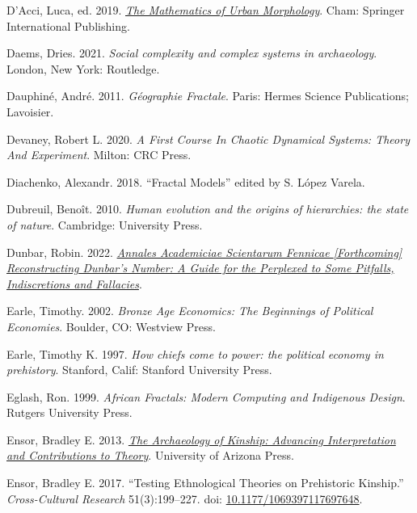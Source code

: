 \documentclass[
  12pt,
]{book}
\newlength{\cslhangindent}
\newlength{\cslentryspacingunit} %
\newenvironment{CSLReferences}[2] %
 {%
  \setlength{\parindent}{0pt}
  \ifodd #1
  \let\oldpar\par
  \def\par{\hangindent=\cslhangindent\oldpar}
  \fi
  \setlength{\parskip}{#2\cslentryspacingunit}
 }%
 {}
\begin{document}
\begin{CSLReferences}{1}{0}
\leavevmode{}%
D'Acci, Luca, ed. 2019. \emph{\href{https://doi.org/10.1007/978-3-030-12381-9}{The Mathematics of Urban Morphology}}. Cham: Springer International Publishing.

\leavevmode{}%
Daems, Dries. 2021. \emph{Social complexity and complex systems in archaeology}. London, New York: Routledge.

\leavevmode{}%
Dauphiné, André. 2011. \emph{Géographie Fractale}. Paris: Hermes Science Publications; Lavoisier.

\leavevmode{}%
Devaney, Robert L. 2020. \emph{A First Course In Chaotic Dynamical Systems: Theory And Experiment}. Milton: CRC Press.

\leavevmode{}%
Diachenko, Alexandr. 2018. {``Fractal Models''} edited by S. López Varela.

\leavevmode{}%
Dubreuil, Benoît. 2010. \emph{Human evolution and the origins of hierarchies: the state of nature}. Cambridge: University Press.

\leavevmode{}%
Dunbar, Robin. 2022. \emph{\href{https://doi.org/10.13140/RG.2.2.34145.58727}{Annales Academiciae Scientarum Fennicae {[}Forthcoming{]} Reconstructing Dunbar's Number: A Guide for the Perplexed to Some Pitfalls, Indiscretions and Fallacies}}.

\leavevmode{}%
Earle, Timothy. 2002. \emph{Bronze Age Economics: The Beginnings of Political Economies}. Boulder, CO: Westview Press.

\leavevmode{}%
Earle, Timothy K. 1997. \emph{How chiefs come to power: the political economy in prehistory}. Stanford, Calif: Stanford University Press.

\leavevmode{}%
Eglash, Ron. 1999. \emph{African Fractals: Modern Computing and Indigenous Design}. Rutgers University Press.

\leavevmode{}%
Ensor, Bradley E. 2013. \emph{\href{https://www.jstor.org/stable/j.ctt183pcj3}{The Archaeology of Kinship: Advancing Interpretation and Contributions to Theory}}. University of Arizona Press.

\leavevmode{}%
Ensor, Bradley E. 2017. {``Testing Ethnological Theories on Prehistoric Kinship.''} \emph{Cross-Cultural Research} 51(3):199--227. doi: \href{https://doi.org/10.1177/1069397117697648}{10.1177/1069397117697648}.


\end{CSLReferences}
\end{document}
